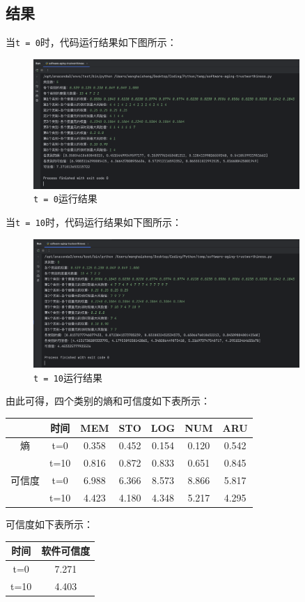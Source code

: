 \documentclass{article}
\begin{document}
\subsection{结果}

当\texttt{t = 0}时，代码运行结果如下图所示：

\begin{figure}[H]
	\centering
	\includegraphics[width=0.9\textwidth]{img/3.png}
	\caption{\texttt{t = 0}运行结果}
\end{figure}

当\texttt{t = 10}时，代码运行结果如下图所示：

\begin{figure}[H]
	\centering
	\includegraphics[width=0.9\textwidth]{img/4.png}
	\caption{\texttt{t = 10}运行结果}
\end{figure}

由此可得，四个类别的熵和可信度如下表所示：

\begin{center}
	\begin{tabular}{|c|c|c|c|c|c|c|}
		\hline
		& 时间 & MEM & STO & LOG & NUM & ARU \\
		\hline
		熵 & t=0 & 0.358 & 0.452 & 0.154 & 0.120 & 0.542 \\
		\cline{2-7}
		& t=10 & 0.816 & 0.872 & 0.833 & 0.651 & 0.845 \\
		\hline
		可信度 & t=0 & 6.988 & 6.366 & 8.573 & 8.866 & 5.817 \\
		\cline{2-7}
		& t=10 & 4.423 & 4.180 & 4.348 & 5.217 & 4.295 \\
		\hline
	\end{tabular}
\end{center}

可信度如下表所示：

\begin{center}
	\begin{tabular}{|c|c|}
		\hline
		时间 & 软件可信度 \\
		\hline
		t=0 & 7.271 \\
		\hline
		t=10 & 4.403 \\
		\hline
	\end{tabular}
\end{center}
\end{document}
